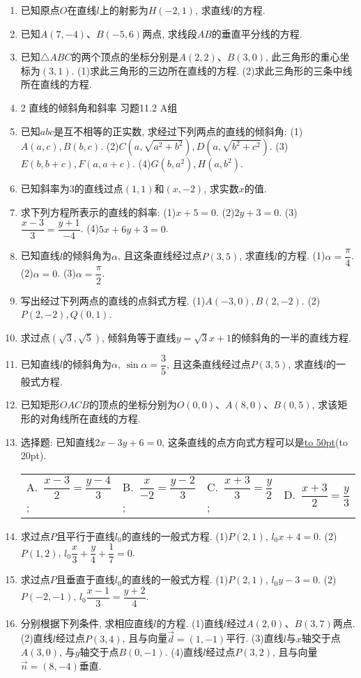 \documentclass[10pt,a4paper]{article}
\newcommand{\blank}[1]{\underline{\hbox to #1pt{}}}
\newcommand{\bracket}[1]{(\hbox to #1pt{})}
\newcommand{\fourch}[4]{\par\begin{tabular}{p{.23\textwidth}p{.23\textwidth}p{.23\textwidth}p{.23\textwidth}}
A.~#1 &B.~#2& C.~#3& D.~#4
\end{tabular}}
\begin{document}
\begin{enumerate}[1.]
\item 已知原点$O$在直线$l$上的射影为$H(-2,1)$, 求直线$l$的方程.
\item 已知$A(7,-4)$、$B(-5,6)$两点, 求线段$AB$的垂直平分线的方程.
\item 已知$\triangle ABC$的两个顶点的坐标分别是$A(2,2)$、$B(3,0)$, 此三角形的重心坐标为$(3,1)$.
(1)求此三角形的三边所在直线的方程.
(2)求此三角形的三条中线所在直线的方程.
\item 2  直线的倾斜角和斜率
习题11.2  A组
\item 已知$abc$是互不相等的正实数, 求经过下列两点的直线的倾斜角:
(1)$A(a,c),B(b,c)$.					(2)$C(a,\sqrt {a^2+b^2}),D(a,\sqrt {b^2+c^2})$.
(3)$E(b,b+c),F(a,a+c)$.				(4)$G(b,a^2),H(a,b^2)$.
\item 已知斜率为3的直线过点$(1,1)$和$(x,-2)$, 求实数$x$的值.
\item 求下列方程所表示的直线的斜率:
(1)$x+5=0$.							(2)$2y+3=0$.
(3)$\dfrac{x-3}3=\dfrac{y+1}{-4}$.						(4)$5x+6y+3=0$.
\item 已知直线$l$的倾斜角为$\alpha$, 且这条直线经过点$P(3,5)$, 求直线$l$的方程.
(1)$\alpha =\dfrac{\pi }4$.								(2)$\alpha =0$.
(3)$\alpha =\dfrac{\pi }2$.
\item 写出经过下列两点的直线的点斜式方程.
(1)$A(-3,0),B(2,-2)$.					(2)$P(2,-2),Q(0,1)$.
\item 求过点$(\sqrt 3,\sqrt 5)$, 倾斜角等于直线$y=\sqrt 3x+1$的倾斜角的一半的直线方程.
\item 已知直线$l$的倾斜角为$\alpha$, $\sin \alpha =\dfrac 35$, 且这条直线经过点$P(3,5)$, 求直线$l$的一般式方程.
\item 已知矩形$OACB$的顶点的坐标分别为$O(0,0)$、$A(8,0)$、$B(0,5)$, 求该矩形的对角线所在直线的方程.
\item 选择题:
已知直线$2x-3y+6=0$, 这条直线的点方向式方程可以是\blank{50}\bracket{20}.
\fourch{$\dfrac{x-3}2=\dfrac{y-4}3$;}{$\dfrac x{-2}=\dfrac{y-2}3$;}{$\dfrac{x+3}3=\dfrac y2$;}{$\dfrac{x+3}2=\dfrac y3$}
\item 求过点$P$且平行于直线$l_0$的直线的一般式方程.
(1)$P(2,1)$, $l_0x+4=0$.				(2)$P(1,2)$, $l_0\dfrac x3+\dfrac y4+\dfrac 17=0$.
\item 求过点$P$且垂直于直线$l_0$的直线的一般式方程.
(1)$P(2,1)$, $l_0y-3=0$.				(2)$P(-2,-1)$, $l_0\dfrac{x-1}3=\dfrac{y+2}4$.
\item 分别根据下列条件, 求相应直线$l$的方程.
(1)直线$l$经过$A(2,0)$、$B(3,7)$两点.
(2)直线$l$经过点$P(3,4)$, 且与向量$\overrightarrow d=(1,-1)$平行.
(3)直线$l$与$x$轴交于点$A(3,0)$, 与$y$轴交于点$B(0,-1)$.
(4)直线$l$经过点$P(3,2)$, 且与向量$\overrightarrow n=(8,-4)$垂直.

\end{enumerate}
\end{document}

